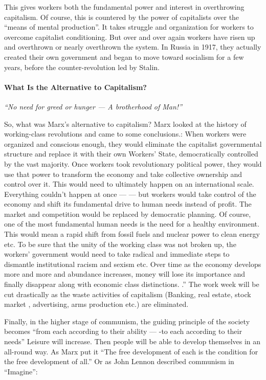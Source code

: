 This gives workers both the fundamental power and interest in overthrowing capitalism. Of course, this is countered by the power of capitalists over the “means of mental production”. It takes struggle and organization for workers to overcome capitalist conditioning. But over and over again workers have risen up and overthrown or nearly overthrown the system. In Russia in 1917, they actually created their own government and began to move toward socialism for a few years, before the counter-revolution led by Stalin.

\paragraph{What Is the Alternative to Capitalism?}

\emph{“No need for greed or hunger — A brotherhood of Man!”}

So, what was Marx’s alternative to capitalism? Marx looked at the history of working-class revolutions and came to some conclusions.: When workers were organized and conscious enough, they would eliminate the capitalist governmental structure and replace it with their own Workers’ State, democratically controlled by the vast majority. Once workers took revolutionary political power, they would use that power to transform the economy and take collective ownership and control over it. This would need to ultimately happen on an international scale. Everything couldn’t happen at once — — but workers would take control of the economy and shift its fundamental drive to human needs instead of profit. The market and competition would be replaced by democratic planning. Of course, one of the most fundamental human needs is the need for a healthy environment. This would mean a rapid shift from fossil fuels and nuclear power to clean energy etc. To be sure that the unity of the working class was not broken up, the workers’ government would need to take radical and immediate steps to dismantle institutional racism and sexism etc. Over time as the economy develops more and more and abundance increases, money will lose its importance and finally disappear along with economic class distinctions. .” The work week will be cut drastically as the waste activities of capitalism (Banking, real estate, stock market , advertising, arms production etc.) are eliminated.

Finally, in the higher stage of communism, the guiding principle of the society becomes “from each according to their ability — -to each according to their needs” Leisure will increase. Then people will be able to develop themselves in an all-round way. As Marx put it “The free development of each is the condition for the free development of all.” Or as John Lennon described communism in “Imagine”:

